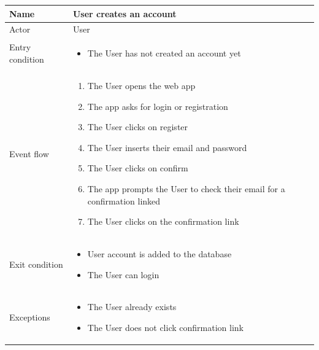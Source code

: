 \begin{table}[H]
    \begin{tabu} to \textwidth {|X|X[4]|}
        \hline
        Name            & User creates an account   \\ \hline
        Actor           & User                      \\ \hline
        Entry condition & \begin{itemize}
            \item The User has not created an account yet
        \end{itemize} \\ \hline
        Event flow      & \begin{enumerate}
            \item The User opens the web app
            \item The app asks for login or registration
            \item The User clicks on register
            \item The User inserts their email and password
            \item The User clicks on confirm
            \item The app prompts the User to check their email for a confirmation linked
            \item The User clicks on the confirmation link
        \end{enumerate} \\ \hline
        Exit condition  & \begin{itemize}
            \item User account is added to the database
            \item The User can login
        \end{itemize} \\ \hline
        Exceptions      & \begin{itemize}
            \item The User already exists
            \item The User does not click confirmation link
        \end{itemize} \\ \hline
    \end{tabu}
\end{table}

